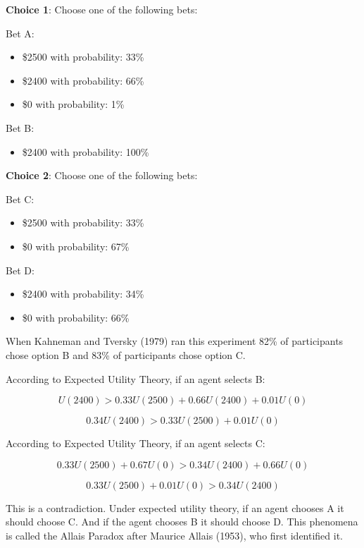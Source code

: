 \documentclass[
  letterpaper,
  DIV=11,
  numbers=noendperiod]{scrreprt}
\providecommand{\tightlist}{%
  \setlength{\itemsep}{0pt}\setlength{\parskip}{0pt}}\usepackage{longtable,booktabs,array}
\begin{document}
\textbf{Choice 1}: Choose one of the following bets:

Bet A:

\begin{itemize}
\tightlist
\item
  \$2500 with probability: 33\%
\item
  \$2400 with probability: 66\%
\item
  \$0 with probability: 1\%
\end{itemize}

Bet B:

\begin{itemize}
\tightlist
\item
  \$2400 with probability: 100\%
\end{itemize}

\textbf{Choice 2}: Choose one of the following bets:

Bet C:

\begin{itemize}
\tightlist
\item
  \$2500 with probability: 33\%\\
\item
  \$0 with probability: 67\%
\end{itemize}

Bet D:

\begin{itemize}
\tightlist
\item
  \$2400 with probability: 34\%
\item
  \$0 with probability: 66\%
\end{itemize}

When Kahneman and Tversky (1979) ran this experiment 82\% of
participants chose option B and 83\% of participants chose option C.

According to Expected Utility Theory, if an agent selects B:

\[
U(2400)>0.33U(2500)+0.66U(2400)+0.01U(0)
\]

\[
0.34U(2400)>0.33U(2500)+0.01U(0)
\]

According to Expected Utility Theory, if an agent selects C:

\[
0.33U(2500)+0.67U(0)> 0.34U(2400)+ 0.66U(0)
\]

\[
0.33U(2500)+0.01U(0)> 0.34U(2400)
\]

This is a contradiction. Under expected utility theory, if an agent
chooses A it should choose C. And if the agent chooses B it should
choose D. This phenomena is called the Allais Paradox after Maurice
Allais (1953), who first identified it.
\end{document}
